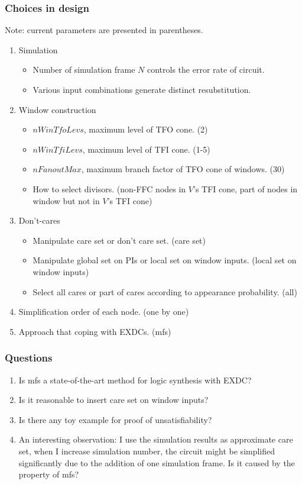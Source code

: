 \documentclass{rpt}
\begin{document}
\subsubsection*{Choices in design}
Note: current parameters are presented in parentheses.
\begin{enumerate}
    \item Simulation
        \begin{itemize}
            \item Number of simulation frame $N$ controls the error rate of circuit.
            \item Various input combinations generate distinct resubstitution.
        \end{itemize}
    \item Window construction
        \begin{itemize}
            \item $nWinTfoLevs$, maximum level of TFO cone. (2)
            \item $nWinTfiLevs$, maximum level of TFI cone. (1-5)
            \item $nFanoutMax$, maximum branch factor of TFO cone of windows. (30)
            \item How to select divisors. (non-FFC nodes in $V$'s TFI cone, part of nodes in window but not in $V$'s TFI cone)
        \end{itemize}
    \item Don't-cares
        \begin{itemize}
            \item Manipulate care set or don't care set. (care set)
            \item Manipulate global set on PIs or local set on window inputs. (local set on window inputs)
            \item Select all cares or part of cares according to appearance probability. (all)
        \end{itemize}
    \item Simplification order of each node. (one by one)
    \item Approach that coping with EXDCs. (mfs)
\end{enumerate}

\subsubsection*{Questions}
\begin{enumerate}
    \item Is mfs a state-of-the-art method for logic synthesis with EXDC?
    \item Is it reasonable to insert care set on window inputs?
    \item Is there any toy example for proof of unsatisfiability?
    \item An interesting observation: I use the simulation results as approximate care set,
        when I increase simulation number,
        the circuit might be simplified significantly due to the addition of one simulation frame.
        Is it caused by the property of mfs?
\end{enumerate}
\end{document}
